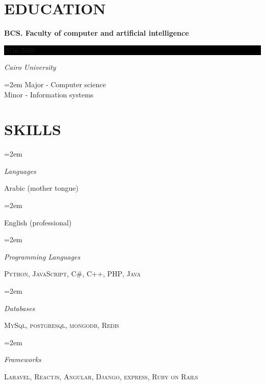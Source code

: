 \documentclass[paper=a4,fontsize=11pt]{scrartcl} %
\newlength{\spacebox}
\newcommand{\sepspace}{\vspace*{1em}}		%
\newcommand{\NewPart}[1]{\section*{\uppercase{#1}}}
\newcommand{\PersonalEntry}[2]{
		\noindent\hangindent=1em\hangafter=0 %
		\parbox{\spacebox}{        %
		\textit{#1}}		       %
		\hspace{1.5em} #2 \par}    %
\newcommand{\SkillsEntry}[2]{      %
		\noindent\hangindent=2em\hangafter=0 %
		\parbox{\spacebox}{        %
		\textit{#1}}			   %
		\hspace{1.5em} #2 \par}    %
\newcommand{\EducationEntry}[4]{
		\noindent \textbf{#1} \hfill      %
		\colorbox{Black}{%
			\parbox{6em}{%
			\hfill\color{White}#2}} \par  %
		\noindent \textit{#3} \par        %
		\noindent\hangindent=2em\hangafter=0 \small #4 %
		\normalsize \par}
\newcommand{\ProjectEntry}[4]{
		\noindent \textbf{\href{https://#2}{#1}} \hfill \par
		 \noindent  \textit{#4}  \hfill    
        \small{\itshape\href{https://#2}{#2}} \par  %
		\noindent\hangindent=2em\hangafter=0 \small #3 %
		\normalsize 
		\sepspace
		\par\noindent\textcolor{gray}{\rule{\textwidth}{0.2pt}}
		}
\begin{document}
\NewPart{Education}{}

\EducationEntry{BCS. Faculty of computer and artificial intelligence}{2016-2020}{Cairo
  University}{Major - Computer science \\ Minor - Information systems}
\sepspace

\NewPart{Skills}{
\SkillsEntry{Languages}{Arabic (mother tongue)}
\SkillsEntry{}{English (professional)}

\sepspace
\SkillsEntry{Programming Languages}{\textsc{Python}, \textsc{JavaScript},  \textsc{C\#}, \textsc{C++},  \textsc{PHP}, \textsc{Java}}
\sepspace


\SkillsEntry{Databases}{\textsc{MySql}, \textsc{postgresql}, \textsc{mongodb}, \textsc{Redis}}

\sepspace


\SkillsEntry{Frameworks}{\textsc{Laravel}, \textsc{Reactjs}, \textsc{Angular}, \textsc{Django}, \textsc{express}, \textsc{Ruby on Rails}}

}




\end{document}
